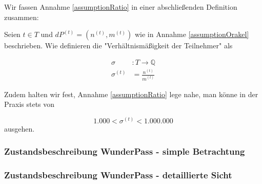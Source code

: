 \vspace{0.3cm}

Wir fassen Annahme \ref{assumptionRatio} in einer abschließenden Definition zusammen:

\vspace{0.3cm}

\begin{Def}\label{defRatio}

Seien $t \in T$ und $dP^{(t)} = \left(n^{(t)}, m^{(t)}\right)$ wie in Annahme \ref{assumptionOrakel} beschrieben. Wie definieren die "Verhältnismäßigkeit der Teilnehmer" als

\begin{align*}
\sigma &: T \rightarrow \mathbb{Q} \\
\sigma^{(t)} &= \frac{n^{(t)}}{m^{(t)}}
\end{align*}

\vspace{0.3cm}

Zudem halten wir fest, Annahme \ref{assumptionRatio} lege nahe, man könne in der Praxis stets von

\begin{equation*}
1.000 < \sigma^{(t)} < 1.000.000
\end{equation*}
ausgehen.

\end{Def}


\vspace{0.6cm}



\subsubsection{Zustandsbeschreibung WunderPass - simple Betrachtung}
\label{sec:eco_zahlen_zustand_wp}







\subsubsection{Zustandsbeschreibung WunderPass - detaillierte Sicht}
\label{sec:eco_zahlen_zustand_wp_advanced}


